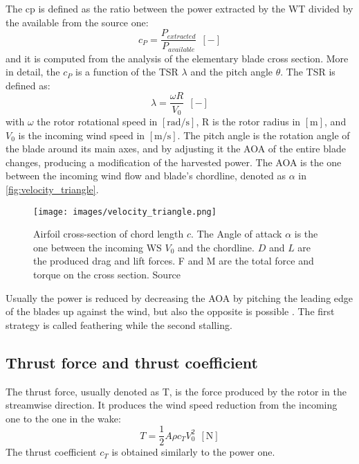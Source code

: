 The \acrfull{cp} is defined as the ratio between the power extracted by the \acrshort{WT} divided by the available from the source one:
\begin{equation}
    c_P = \frac{P_{extracted}}{P_{available}} \ \ \left[-\right]
    \label{eq:c_P}
\end{equation}
and it is computed from the analysis of the elementary blade cross section. More in detail, the $c_P$ is a function of the \acrfull{TSR} $\lambda$ and the pitch angle $\theta$. The \acrshort{TSR} is defined as:
\begin{equation}
    \lambda = \frac{\omega R}{V_0} \ \ \left[-\right]
    \label{eq:TSR}
\end{equation}
with $\omega$ the rotor rotational speed in $\left[\si{\radian \per \second}\right]$, R is the rotor radius in $\left[\si{\meter}\right]$, and $V_0$ is the incoming wind speed in  $\left[\si{\meter \per \second}\right]$. The pitch angle is the rotation angle of the blade around its main axes, and by adjusting it the \acrfull{AOA} of the entire blade changes, producing a modification of the harvested power. The \acrshort{AOA} is the one between the incoming wind flow and blade's chordline, denoted as $\alpha$ in \autoref{fig:velocity_triangle}. 
\begin{figure}[htb]
    \centering
    \texttt{[image: images/velocity\_triangle.png]}
    \caption{Airfoil cross-section of chord length $c$. The Angle of attack $\alpha$ is the one between the incoming \acrshort{WS} $V_0$ and the chordline. $D$ and $L$ are the produced drag and lift forces. F and M are the total force and torque on the cross section. Source \cite{Aerodynamics_of_wind_turbines}}
    \label{fig:velocity_triangle}
\end{figure}

Usually the power is reduced by decreasing the \acrshort{AOA} by pitching the leading edge of the blades up against the wind, but also the opposite is possible \cite{Aerodynamics_of_wind_turbines}. The first strategy is called feathering while the second stalling.

\subsection{Thrust force and thrust coefficient}
The thrust force, usually denoted as T, is the force produced by the rotor in the streamwise direction. It produces the wind speed reduction from the incoming one to the one in the wake:
\begin{equation}
    T = \frac{1}{2} A \rho c_T V_0^2 \ \ \left[\si{\newton}\right]
    \label{eq:thrust_coeff}
\end{equation}
The thrust coefficient $c_T$ is obtained similarly to the power one.

